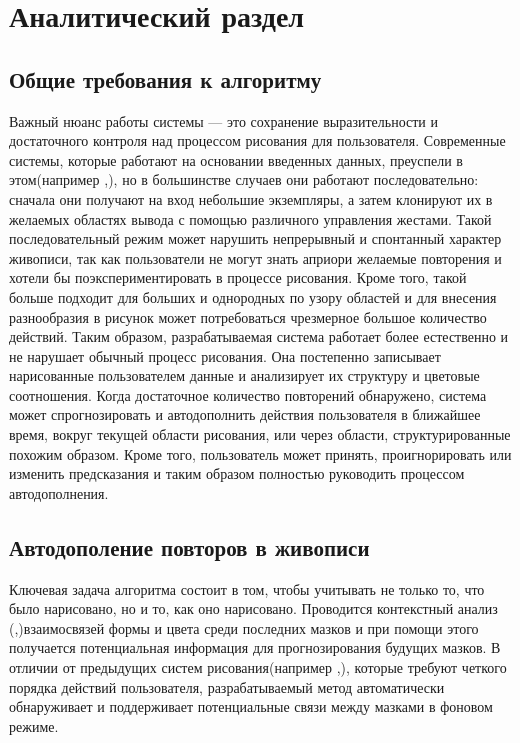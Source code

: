 \chapter{Аналитический раздел}
\label{cha:analysis}
%
%
\section{Общие требования к алгоритму}
Важный нюанс работы системы — это сохранение выразительности и достаточного контроля над процессом рисования для пользователя\cite{bib1}. Современные системы, которые работают на основании введенных данных, преуспели в этом(например \cite{bib2},\cite{bib3}), но в большинстве случаев они работают последовательно: сначала они получают на вход небольшие экземпляры, а затем клонируют их в желаемых областях вывода с помощью различного управления жестами. Такой последовательный режим может нарушить непрерывный и спонтанный характер живописи, так как пользователи не могут знать априори желаемые повторения и хотели бы поэкспериментировать в процессе рисования. Кроме того, такой больше подходит для больших и однородных по узору областей и для внесения разнообразия в рисунок может потребоваться чрезмерное большое количество действий. Таким образом, разрабатываемая система работает более естественно и не нарушает обычный процесс рисования. Она постепенно записывает нарисованные пользователем данные и анализирует их структуру и цветовые соотношения. Когда достаточное количество повторений обнаружено, система может спрогнозировать и автодополнить действия пользователя в ближайшее время, вокруг текущей области рисования, или через области, структурированные похожим образом. Кроме того, пользователь может принять, проигнорировать или изменить предсказания и таким образом полностью руководить процессом автодополнения.
\section{Автодополение повторов в живописи}
Ключевая задача алгоритма состоит в том, чтобы учитывать не только то, что было нарисовано, но и то, как оно нарисовано. Проводится контекстный анализ (\cite{bib23},\cite{bib24})взаимосвязей формы и цвета среди последних мазков и при помощи этого получается потенциальная информация для прогнозирования будущих мазков. В отличии от предыдущих систем рисования(например \cite{bib26},\cite{bib27}), которые требуют четкого порядка действий пользователя, разрабатываемый метод автоматически обнаруживает и поддерживает потенциальные связи между мазками в фоновом режиме. 
